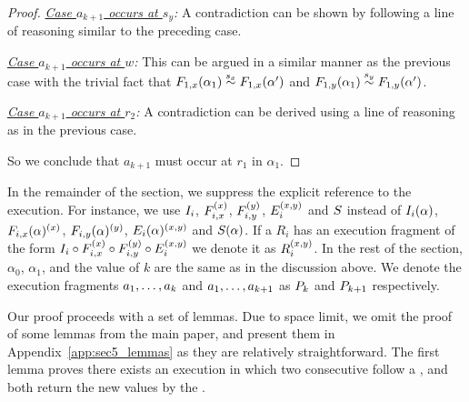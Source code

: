 \begin{proof}
\emph{ \underline{Case $a_{k+1}$ occurs at $s_y$}:} A  contradiction can be shown by following a line of reasoning similar to the  preceding case.

\emph{\underline{Case $a_{k+1}$ occurs at $w$}:}
This can be argued in a similar manner as the previous case with the trivial fact that $\frage{F_{1,x}}{\alpha_1}{} \stackrel{s_x}{\sim} \frage{F_{1,x}}{\alpha'}{}$ and $\frage{F_{1,y}}{\alpha_1}{} \stackrel{s_y}{\sim} \frage{F_{1,y}}{\alpha'}{}$.


\emph{\underline{Case $a_{k+1}$ occurs at $r_2$}:} 
A contradiction can be derived using a line of  reasoning as in the previous case.

So we conclude that $a_{k+1}$ must occur at $r_1$ in $\alpha_1$.
\end{proof}

In the remainder of the section, we suppress the explicit reference to the execution. For instance, we use $\fragt{I_i}{\alpha}{}$, $\fragt{F_{i,x}}{\alpha}{x}$, 
$\fragt{F_{i,y}}{\alpha}{y}$, $\fragt{E_i}{\alpha}{x, y} $ and $ \fragt{S}{\alpha}{}$
instead of $\frage{I_i}{\alpha}{}$, $\frage{F_{i,x}}{\alpha}{x}$, 
$\frage{F_{i,y}}{\alpha}{y}$, $\frage{E_i}{\alpha}{x, y} $ and $ \frage{S}{\alpha}{}$.
If a 
\rot{} $R_i$ has an  execution fragment of the form 
$\fragt{I_i}{\alpha}{} \circ \fragt{F_{i,x}}{\alpha}{x} \circ 
\fragt{F_{i,y}}{\alpha}{y} \circ \fragt{E_i}{\alpha}{x, y} $
we denote it  as  $\fragt{R_i}{}{x, y}$. 
In the rest of the section, $\alpha_0$, $\alpha_1$, and the value of $k$ are the same as in the discussion above. We denote  the execution fragments  $\finiteprefixt{k}{k}$ and $\finiteprefixt{k}{k+1}$ as 
$\finiteprefixA{k}{k}$ and $\finiteprefixA{k}{k+1}$ respectively.

Our proof proceeds with a set of lemmas. Due to space limit, we omit the proof of some lemmas from the main paper, and present them in Appendix~\ref{app:sec5_lemmas} as they are relatively straightforward.
The first lemma proves there exists an execution in which two consecutive \rots{} follow a \wot{}, and both \rots{}
return the new values by the \wot{}.

